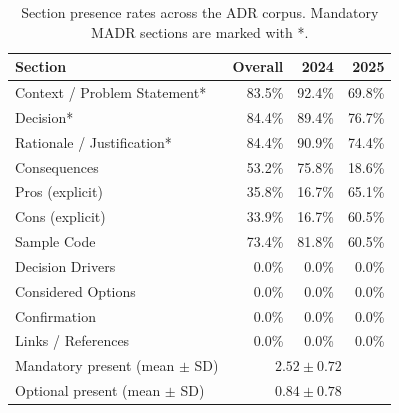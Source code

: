 \begin{table}[htbp]
\caption{Section presence rates across the ADR corpus. Mandatory MADR sections are marked with *.}
\label{tab:sections}
\centering
\begin{tabular}{lrrr}
\toprule
\textbf{Section} & \textbf{Overall} & \textbf{2024} & \textbf{2025} \\
\midrule
Context / Problem Statement* & 83.5\% & 92.4\% & 69.8\% \\
Decision* & 84.4\% & 89.4\% & 76.7\% \\
Rationale / Justification* & 84.4\% & 90.9\% & 74.4\% \\
Consequences & 53.2\% & 75.8\% & 18.6\% \\
Pros (explicit) & 35.8\% & 16.7\% & 65.1\% \\
Cons (explicit) & 33.9\% & 16.7\% & 60.5\% \\
Sample Code & 73.4\% & 81.8\% & 60.5\% \\
\midrule
Decision Drivers & 0.0\% & 0.0\% & 0.0\% \\
Considered Options & 0.0\% & 0.0\% & 0.0\% \\
Confirmation & 0.0\% & 0.0\% & 0.0\% \\
Links / References & 0.0\% & 0.0\% & 0.0\% \\
\midrule
Mandatory present (mean $\pm$ SD) & \multicolumn{3}{c}{$2.52 \pm 0.72$} \\
Optional present (mean $\pm$ SD) & \multicolumn{3}{c}{$0.84 \pm 0.78$} \\
\bottomrule
\end{tabular}
\end{table}


